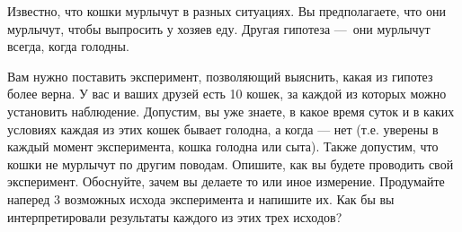
Известно, что кошки мурлычут в разных ситуациях. Вы предполагаете, что они мурлычут, чтобы выпросить у хозяев еду. Другая гипотеза — они мурлычут всегда, когда голодны.

Вам нужно поставить эксперимент, позволяющий выяснить, какая из гипотез более верна. У вас и ваших друзей есть 10 кошек, за каждой из которых можно установить наблюдение. Допустим, вы уже знаете, в какое время суток и в каких условиях каждая из этих кошек бывает голодна, а когда — нет (т.е. уверены в каждый момент эксперимента, кошка голодна или сыта). Также допустим, что кошки не мурлычут по другим поводам. Опишите, как вы будете проводить свой эксперимент. Обоснуйте, зачем вы делаете то или иное измерение. Продумайте наперед 3 возможных исхода эксперимента и напишите их. Как бы вы интерпретировали результаты каждого из этих трех исходов?
